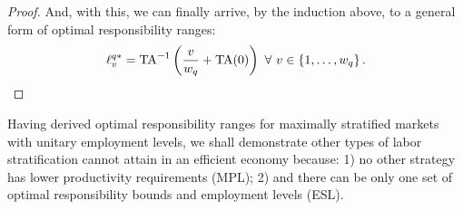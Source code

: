 \documentclass[hidelinks, nonatbib]{elsarticle}
\begin{document}
\begin{lemma}
\begin{proof}
        And, with this, we can finally arrive, by the induction above, to a general form of optimal responsibility ranges:
        \begin{gather}
        \ell_{v}^{q*}
        =
        \text{TA}^{-1}\left(
            \frac{v}{w_q}
            +
            \text{TA}(0)
        \right)
        \
        \forall
        \
        v \in 
        \left\{
            1, \dots, w_q
        \right\}
        .
        \end{gather}    
    \end{proof}
\end{lemma}

Having derived optimal responsibility ranges for maximally stratified markets with unitary employment levels, we shall demonstrate other types of labor stratification cannot attain in an efficient economy because: 1) no other strategy has lower productivity requirements (MPL); 2) and there can be only one set of optimal responsibility bounds and employment levels (ESL).
\end{document}
